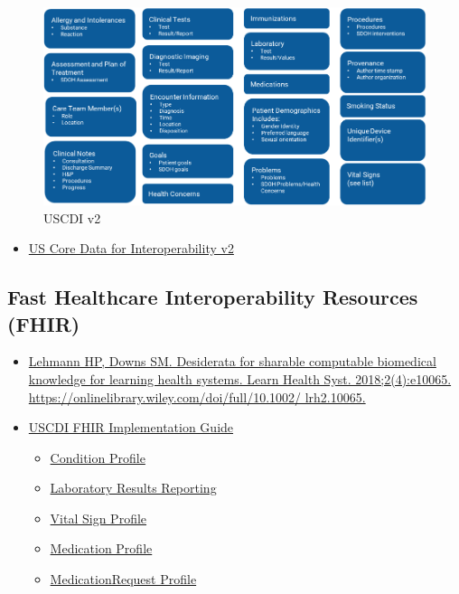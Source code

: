 \documentclass[
]{journal}
\providecommand{\tightlist}{%
  \setlength{\itemsep}{0pt}\setlength{\parskip}{0pt}}
\begin{document}
\begin{figure}

{\centering \includegraphics[width=1\linewidth]{assets/chapter_1/uscdi_v2} 

}

\caption{USCDI v2}\label{fig:uscdi}
\end{figure}

\begin{itemize}
\tightlist
\item
  \href{https:/healthit.gov/isa/uscdi-data-class}{US Core Data for Interoperability v2}
\end{itemize}

\hypertarget{fast-healthcare-interoperability-resources-fhir}{%
\subsection{Fast Healthcare Interoperability Resources (FHIR)}\label{fast-healthcare-interoperability-resources-fhir}}

\begin{itemize}
\item
  \href{https://onlinelibrary.wiley.com/doi/full/10.1002/\%20lrh2.10065}{Lehmann HP, Downs SM. Desiderata for sharable computable biomedical knowledge for learning health systems. Learn Health Syst. 2018;2(4):e10065. https://onlinelibrary.wiley.com/doi/full/10.1002/ lrh2.10065.}
\item
  \href{https://www.hl7.org/fhir/us/core/index.html}{USCDI FHIR Implementation Guide}

  \begin{itemize}
  \item
    \href{https://www.hl7.org/fhir/us/core/StructureDefinition-us-core-condition.html\#notes}{Condition Profile}
  \item
    \href{https://www.hl7.org/fhir/us/core/StructureDefinition-us-core-observation-lab.html\#mandatory-search-parameters}{Laboratory Results Reporting}
  \item
    \href{https://www.hl7.org/fhir/us/core/StructureDefinition-us-core-blood-pressure.html\#mandatory-search-parameters}{Vital Sign Profile}
  \item
    \href{https://www.hl7.org/fhir/us/core/StructureDefinition-us-core-medication.html}{Medication Profile}
  \item
    \href{https://www.hl7.org/fhir/us/core/StructureDefinition-us-core-medicationrequest.html}{MedicationRequest Profile}
  \end{itemize}
\end{itemize}
\end{document}
